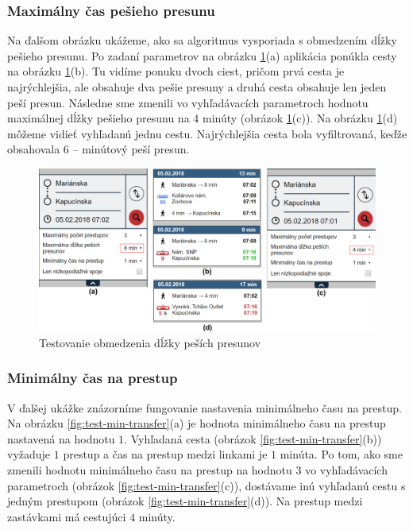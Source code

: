 \subsubsection{Maximálny čas pešieho presunu}
Na ďalšom obrázku ukážeme, ako sa algoritmus vysporiada s obmedzením dĺžky pešieho presunu. Po zadaní parametrov na obrázku \ref{fig:test-max-walking}(a) aplikácia ponúkla cesty na obrázku \ref{fig:test-max-walking}(b). Tu vidíme ponuku dvoch ciest, pričom prvá cesta je najrýchlejšia, ale obsahuje dva pešie presuny a druhá cesta obsahuje len jeden peší presun. 
Následne sme zmenili vo vyhľadávacích parametroch hodnotu maximálnej dĺžky pešieho presunu na $4$ minúty (obrázok \ref{fig:test-max-walking}(c)). Na obrázku \ref{fig:test-max-walking}(d) môžeme vidieť vyhľadanú jednu cestu. Najrýchlejšia cesta bola vyfiltrovaná, keďže obsahovala $6$ – minútový peší presun. 

\begin{figure}[H]
\centerline{\includegraphics[width=1.0\textwidth]{images/test/max-walking}}
\caption[Testovanie obmedzenia dĺžky peších presunov]{Testovanie obmedzenia dĺžky peších presunov}
\label{fig:test-max-walking}
\end{figure}


\subsubsection{Minimálny čas na prestup}
V ďalšej ukážke znázorníme fungovanie nastavenia minimálneho času na prestup. Na obrázku \ref{fig:test-min-transfer}(a) je hodnota minimálneho času na prestup nastavená na hodnotu $1$. Vyhľadaná cesta (obrázok \ref{fig:test-min-transfer}(b)) vyžaduje $1$ prestup a čas na prestup medzi linkami je $1$ minúta. Po tom, ako sme zmenili hodnotu minimálneho času na prestup na hodnotu $3$ vo vyhľadávacích parametroch (obrázok \ref{fig:test-min-transfer}(c)), dostávame inú vyhľadanú cestu s jedným prestupom (obrázok \ref{fig:test-min-transfer}(d)). Na prestup medzi zastávkami má cestujúci $4$ minúty.

